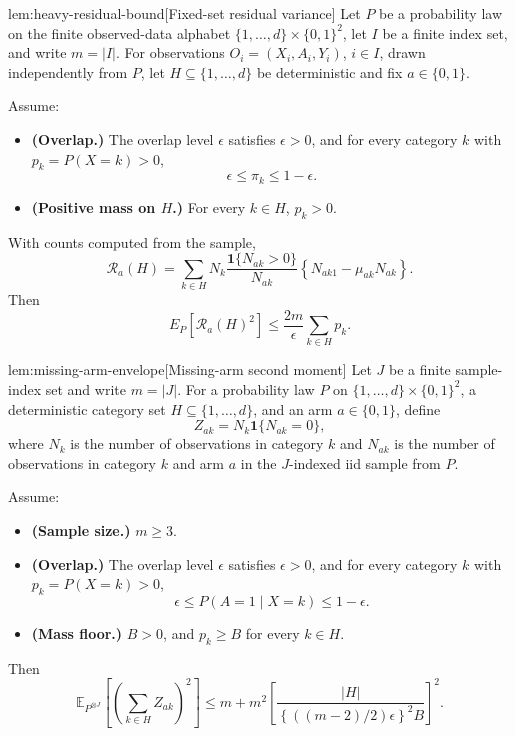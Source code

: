 \begin{lemmav}{lem:heavy-residual-bound}[Fixed-set residual variance]
Let \(P\) be a probability law on the finite observed-data alphabet
\(\{1,\ldots,d\}\times\{0,1\}^2\), let \(I\) be a finite index set, and write
\(m=|I|\).  For observations \(O_i=(X_i,A_i,Y_i)\), \(i\in I\), drawn independently
from \(P\), let \(H\subseteq\{1,\ldots,d\}\) be deterministic and fix
\(a\in\{0,1\}\).

Assume:
\begin{itemize}
\item \textbf{(Overlap.)} The overlap level \(\epsilon\) satisfies \(\epsilon>0\), and for every category \(k\) with \(p_k=P(X=k)>0\),
\[
\epsilon\le \pi_k\le 1-\epsilon .
\]
\item \textbf{(Positive mass on \(H\).)} For every \(k\in H\), \(p_k>0\).
\end{itemize}

With counts computed from the sample,
\[
\mathcal R_a(H)
=
\sum_{k\in H}
N_k\frac{\mathbf 1\{N_{ak}>0\}}{N_{ak}}
\left\{N_{ak1}-\mu_{ak}N_{ak}\right\}.
\]
Then
\[
E_P\!\left[\mathcal R_a(H)^2\right]
\le
\frac{2m}{\epsilon}\sum_{k\in H}p_k .
\]
\end{lemmav}

\begin{lemmav}{lem:missing-arm-envelope}[Missing-arm second moment]
Let \(J\) be a finite sample-index set and write \(m=|J|\). For a probability law \(P\) on \(\{1,\ldots,d\}\times\{0,1\}^2\), a deterministic category set \(H\subseteq\{1,\ldots,d\}\), and an arm \(a\in\{0,1\}\), define
\[
Z_{ak}=N_k\mathbf 1\{N_{ak}=0\},
\]
where \(N_k\) is the number of observations in category \(k\) and \(N_{ak}\) is the number of observations in category \(k\) and arm \(a\) in the \(J\)-indexed iid sample from \(P\).

Assume:
\begin{itemize}
\item \textbf{(Sample size.)} \(m\ge 3\).
\item \textbf{(Overlap.)} The overlap level \(\epsilon\) satisfies \(\epsilon>0\), and for every category \(k\) with \(p_k=P(X=k)>0\),
\[
\epsilon\le P(A=1\mid X=k)\le 1-\epsilon .
\]
\item \textbf{(Mass floor.)} \(B>0\), and \(p_k\ge B\) for every \(k\in H\).
\end{itemize}
Then
\[
\mathbb E_{P^{\otimes J}}\left[
\left(\sum_{k\in H} Z_{ak}\right)^2
\right]
\le
m+m^2
\left[
\frac{|H|}
{\left\{\left((m-2)/2\right)\epsilon\right\}^2 B}
\right]^2 .
\]
\end{lemmav}

